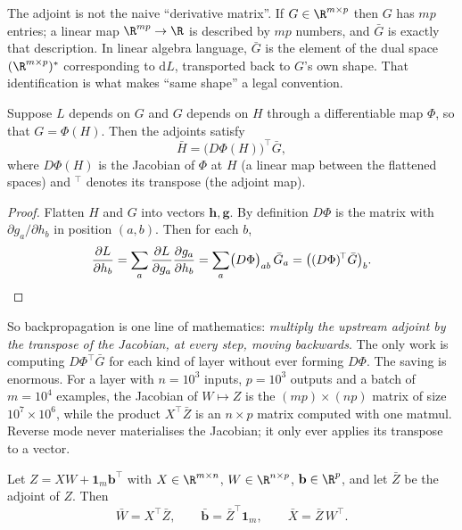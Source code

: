 The adjoint is not the naive ``derivative matrix''. If $G\in\R^{m\times p}$
then $G$ has $mp$ entries; a linear map $\R^{mp}\to\R$ is described by $mp$
numbers, and $\bar G$ is exactly that description. In linear algebra language,
$\bar G$ is the element of the dual space $(\R^{m\times p})^*$ corresponding to
$\mathrm{d}L$, transported back to $G$'s own shape. That identification is what
makes ``same shape'' a legal convention.

\begin{lemma}\label{lem:adjoint-chain}
Suppose $L$ depends on $G$ and $G$ depends on $H$ through a differentiable map
$\Phi$, so that $G=\Phi(H)$. Then the adjoints satisfy
\[
  \bar{H}=\bigl(D\Phi(H)\bigr)^{\!\top}\bar{G},
\]
where $D\Phi(H)$ is the Jacobian of $\Phi$ at $H$ (a linear map between the
flattened spaces) and $^{\!\top}$ denotes its transpose (the adjoint map).
\end{lemma}

\begin{proof}
Flatten $H$ and $G$ into vectors $\mathbf{h},\mathbf{g}$. By definition
$D\Phi$ is the matrix with $\partial g_a/\partial h_b$ in position $(a,b)$.
Then for each $b$,
\[
  \frac{\partial L}{\partial h_b}
  =\sum_{a}\frac{\partial L}{\partial g_a}\frac{\partial g_a}{\partial h_b}
  =\sum_{a}\bigl(D\Phi\bigr)_{ab}\,\bar{G}_{a}
  =\bigl((D\Phi)^{\!\top}\bar{G}\bigr)_{b}. \qedhere
\]
\end{proof}

So backpropagation is one line of mathematics: \emph{multiply the upstream
adjoint by the transpose of the Jacobian, at every step, moving backwards}.
The only work is computing $D\Phi^{\!\top}\bar G$ for each kind of layer without
ever forming $D\Phi$. The saving is enormous. For a layer with $n=10^{3}$
inputs, $p=10^{3}$ outputs and a batch of $m=10^{4}$ examples, the Jacobian of
$W\mapsto Z$ is the $(mp)\times(np)$ matrix of size $10^{7}\times10^{6}$, while
the product $X^{\!\top}\bar Z$ is an $n\times p$ matrix computed with one
matmul. Reverse mode never materialises the Jacobian; it only ever applies its
transpose to a vector.

\begin{theorem}\label{thm:affine-backprop}
Let $Z=XW+\mathbf{1}_m\mathbf{b}^{\!\top}$ with $X\in\R^{m\times n}$,
$W\in\R^{n\times p}$, $\mathbf{b}\in\R^{p}$, and let $\bar Z$ be the adjoint of
$Z$. Then
\[
  \bar W=X^{\!\top}\bar Z,\qquad
  \bar{\mathbf b}=\bar Z^{\!\top}\mathbf{1}_m,\qquad
  \bar X=\bar Z\,W^{\!\top}.
\]
\end{theorem}

